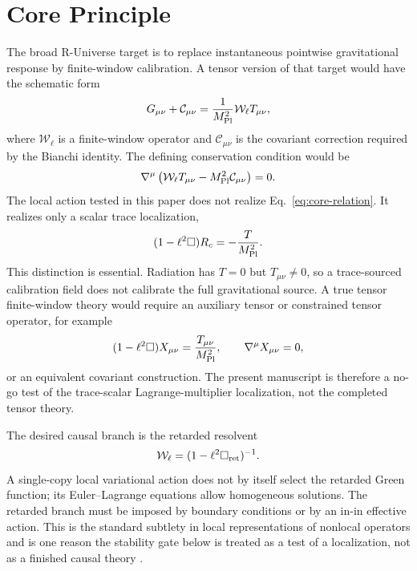 \documentclass[12pt,a4paper]{article}
\begin{document}
\section{Core Principle}

The broad R-Universe target is to replace instantaneous pointwise gravitational response by finite-window calibration. A tensor version of that target would have the schematic form
\begin{equation}
G_{\mu\nu}+\mathcal C_{\mu\nu}
=\frac{1}{M_{\rm Pl}^2}\mathcal W_\ell T_{\mu\nu},
\label{eq:core-relation}
\end{equation}
where $\mathcal W_\ell$ is a finite-window operator and $\mathcal C_{\mu\nu}$ is the covariant correction required by the Bianchi identity. The defining conservation condition would be
\begin{equation}
\nabla^\mu\left(\mathcal W_\ell T_{\mu\nu}-M_{\rm Pl}^2\mathcal C_{\mu\nu}\right)=0.
\label{eq:conservation-core}
\end{equation}
The local action tested in this paper does not realize Eq.~\eqref{eq:core-relation}. It realizes only a scalar trace localization,
\begin{equation}
(1-\ell^2\Box)R_c=-\frac{T}{M_{\rm Pl}^2}.
\label{eq:trace-only}
\end{equation}
This distinction is essential. Radiation has $T=0$ but $T_{\mu\nu}\neq0$, so a trace-sourced calibration field does not calibrate the full gravitational source. A true tensor finite-window theory would require an auxiliary tensor or constrained tensor operator, for example
\begin{equation}
(1-\ell^2\Box)X_{\mu\nu}=\frac{T_{\mu\nu}}{M_{\rm Pl}^2},
\qquad
\nabla^\mu X_{\mu\nu}=0,
\label{eq:tensor-target}
\end{equation}
or an equivalent covariant construction. The present manuscript is therefore a no-go test of the trace-scalar Lagrange-multiplier localization, not the completed tensor theory.

The desired causal branch is the retarded resolvent
\begin{equation}
\mathcal W_\ell=(1-\ell^2\Box_{\rm ret})^{-1}.
\label{eq:retarded-window}
\end{equation}
A single-copy local variational action does not by itself select the retarded Green function; its Euler--Lagrange equations allow homogeneous solutions. The retarded branch must be imposed by boundary conditions or by an in-in effective action. This is the standard subtlety in local representations of nonlocal operators and is one reason the stability gate below is treated as a test of a localization, not as a finished causal theory \citep{MaggioreMancarella2014,Woodard2014,FoffaMaggiore2014}.
\end{document}
